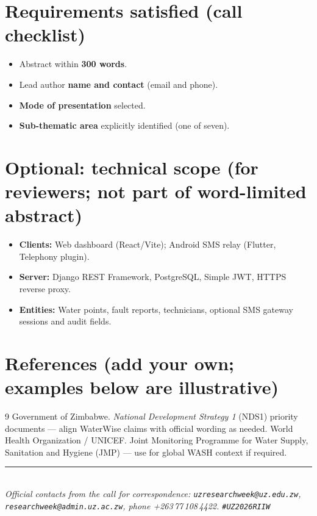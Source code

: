 \documentclass[11pt,a4paper]{article}
\begin{document}
\section*{Requirements satisfied (call checklist)}
\begin{itemize}
  \item Abstract within \textbf{300 words}.
  \item Lead author \textbf{name and contact} (email and phone).
  \item \textbf{Mode of presentation} selected.
  \item \textbf{Sub-thematic area} explicitly identified (one of seven).
\end{itemize}

\section*{Optional: technical scope (for reviewers; not part of word-limited abstract)}
\begin{itemize}
  \item \textbf{Clients:} Web dashboard (React/Vite); Android SMS relay (Flutter, Telephony plugin).
  \item \textbf{Server:} Django REST Framework, PostgreSQL, Simple JWT, HTTPS reverse proxy.
  \item \textbf{Entities:} Water points, fault reports, technicians, optional SMS gateway sessions and audit fields.
\end{itemize}

\section*{References (add your own; examples below are illustrative)}
\begin{thebibliography}{9}
 Government of Zimbabwe. \textit{National Development Strategy 1} (NDS1) priority documents --- align WaterWise claims with official wording as needed.
 World Health Organization / UNICEF. Joint Monitoring Programme for Water Supply, Sanitation and Hygiene (JMP) --- use for global WASH context if required.
\end{thebibliography}

\vfill
\noindent\rule{\linewidth}{0.4pt}\\[0.35em]
\small\textit{Official contacts from the call for correspondence: \texttt{uzresearchweek@uz.edu.zw}, \texttt{researchweek@admin.uz.ac.zw}, phone +263\,77\,108\,4422. \quad \texttt{\#UZ2026RIIW}}
\end{document}
